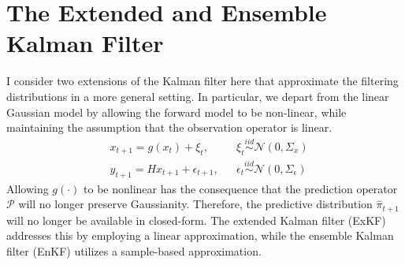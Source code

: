 \documentclass[12pt]{article}
\begin{document}
\section{The Extended and Ensemble Kalman Filter}
I consider two extensions of the Kalman filter here that approximate the filtering distributions in a more general setting. In particular, we depart from the linear 
Gaussian model by allowing the forward model to be non-linear, while maintaining the assumption that the observation operator is linear. 
\begin{align}
&x_{t + 1} = g(x_t) + \xi_t, && \xi_t \overset{iid}{\sim} \mathcal{N}(0, \Sigma_x) \\
&y_{t + 1} = Hx_{t+1} + \epsilon_{t+1}, && \epsilon_t \overset{iid}{\sim} \mathcal{N}(0, \Sigma_\epsilon) \nonumber 
\end{align}
Allowing $g(\cdot)$ to be nonlinear has the consequence that the prediction operator $\mathcal{P}$ will no longer preserve Gaussianity. Therefore, the predictive 
distribution $\hat{\pi}_{t+1}$ will no longer be available in closed-form. The extended Kalman filter (ExKF) addresses this by employing a linear approximation, while 
the ensemble Kalman filter (EnKF) utilizes a sample-based approximation. 
\end{document}
